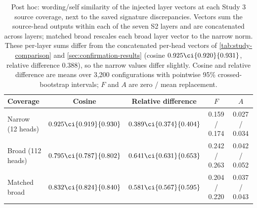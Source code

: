 \begin{table}[t]
\centering\small
\caption{Post hoc: wording/self similarity of the injected layer vectors at each Study 3 source coverage, next to the saved signature discrepancies. Vectors sum the source-head outputs within each of the seven S2 layers and are concatenated across layers; matched broad rescales each broad layer vector to the narrow norm. These per-layer sums differ from the concatenated per-head vectors of \cref{tab:study-comparison} and \cref{sec:confirmation-results} (cosine $0.925\ci{0.920}{0.931}$, relative difference 0.388), so the narrow values differ slightly. Cosine and relative difference are means over 3,200 configurations with pointwise 95\% crossed-bootstrap intervals; $F$ and $A$ are zero / mean replacement.}
\label{tab:posthoc-coverage}
\begin{tabular}{@{}lcccc@{}}
\toprule
Coverage & Cosine & Relative difference & $F$ & $A$ \\
\midrule
Narrow (12 heads) & $0.925\ci{0.919}{0.930}$ & $0.389\ci{0.374}{0.404}$ & 0.159 / 0.174 & 0.027 / 0.034 \\
Broad (112 heads) & $0.795\ci{0.787}{0.802}$ & $0.641\ci{0.631}{0.653}$ & 0.242 / 0.263 & 0.042 / 0.052 \\
Matched broad & $0.832\ci{0.824}{0.840}$ & $0.581\ci{0.567}{0.595}$ & 0.204 / 0.220 & 0.037 / 0.043 \\
\bottomrule
\end{tabular}
\end{table}
